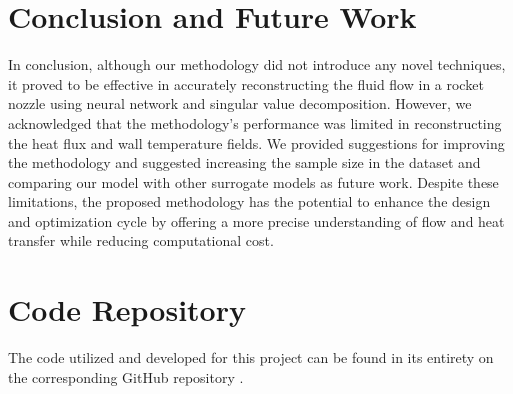 \documentclass[10pt,oneside,a4paper,twocolumn]{article}
\begin{document}
\section{Conclusion and Future Work}

In conclusion, although our methodology did not introduce any novel techniques, it proved to be effective in accurately reconstructing the fluid flow in a rocket nozzle using neural network and singular value decomposition. However, we acknowledged that the methodology's performance was limited in reconstructing the heat flux and wall temperature fields. We provided suggestions for improving the methodology and suggested increasing the sample size in the dataset and comparing our model with other surrogate models as future work. Despite these limitations, the proposed methodology has the potential to enhance the design and optimization cycle by offering a more precise understanding of flow and heat transfer while reducing computational cost.

\appendix

\section{Code Repository}

The code utilized and developed for this project can be found in its entirety on the corresponding GitHub repository \cite{Carvalho_A_Flow_Reconstruction_2023}.

\printbibliography[title=Bibliography, heading=bibintoc]
\end{document}
